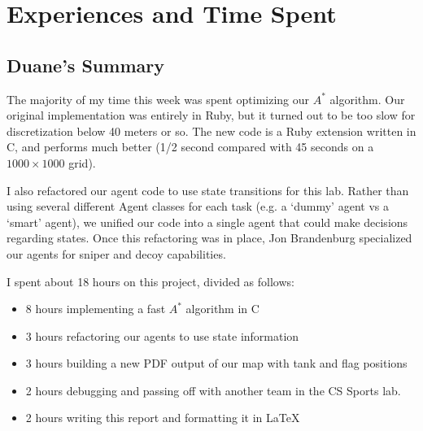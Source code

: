 \chapter{Experiences and Time Spent}\label{chap:exp}
\section{Duane's Summary}
The majority of my time this week was spent optimizing our $A^*$ algorithm.  Our original implementation was entirely in Ruby, but it turned out to be too slow for discretization below 40 meters or so.  The new code is a Ruby extension written in C, and performs much better (1/2 second compared with 45 seconds on a $1000\times 1000$ grid).
\par
I also refactored our agent code to use state transitions for this lab.  Rather than using several different Agent classes for each task (e.g. a `dummy' agent vs a `smart' agent), we unified our code into a single agent that could make decisions regarding states.  Once this refactoring was in place, Jon Brandenburg specialized our agents for sniper and decoy capabilities.
\par
I spent about 18 hours on this project, divided as follows:
\begin{itemize}
    \item 8 hours implementing a fast $A^*$ algorithm in C
    \item 3 hours refactoring our agents to use state information
    \item 3 hours building a new PDF output of our map with tank and flag positions
    \item 2 hours debugging and passing off with another team in the CS Sports lab.
    \item 2 hours writing this report and formatting it in \LaTeX
\end{itemize}


